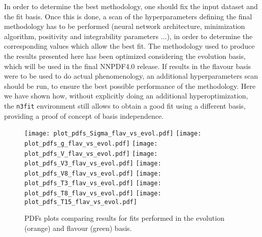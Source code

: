 %
In order to determine the best methodology, one should fix the input dataset and the fit basis. Once this is done,
a scan of the hyperparameters defining the final methodology has to be performed 
(neural network architecture, minimization algorithm, positivity and integrability parameters ...), in order to determine
the corresponding values which allow the best fit.
The methodology used to produce the results presented here has been optimized considering the evolution basis,
which will be used in the final NNPDF4.0 release.  
If results in the flavour basis were to be used to do actual phenomenology, an additional hyperparameters scan
should be run, to ensure the best possible performance of the methodology. 
Here we have shown how, without explicitly doing an additional hyperoptimization, the {\tt n3fit} environment still
allows to obtain a good fit using a different basis, providing a proof of concept of basis independence.


\begin{figure}[t!]
    \begin{center}
        \texttt{[image: plot\_pdfs\_Sigma\_flav\_vs\_evol.pdf]}
        \texttt{[image: plot\_pdfs\_g\_flav\_vs\_evol.pdf]}
        \texttt{[image: plot\_pdfs\_V\_flav\_vs\_evol.pdf]}
        \texttt{[image: plot\_pdfs\_V3\_flav\_vs\_evol.pdf]}
        \texttt{[image: plot\_pdfs\_V8\_flav\_vs\_evol.pdf]}
        \texttt{[image: plot\_pdfs\_T3\_flav\_vs\_evol.pdf]}
        \texttt{[image: plot\_pdfs\_T8\_flav\_vs\_evol.pdf]}
        \texttt{[image: plot\_pdfs\_T15\_flav\_vs\_evol.pdf]}
        \caption{PDFs plots comparing results for fits performed in the evolution (orange) and flavour (green) basis.} 
        \label{fig:pdfs_plots_flav_vs_evol} 
    \end{center}
  \end{figure}



